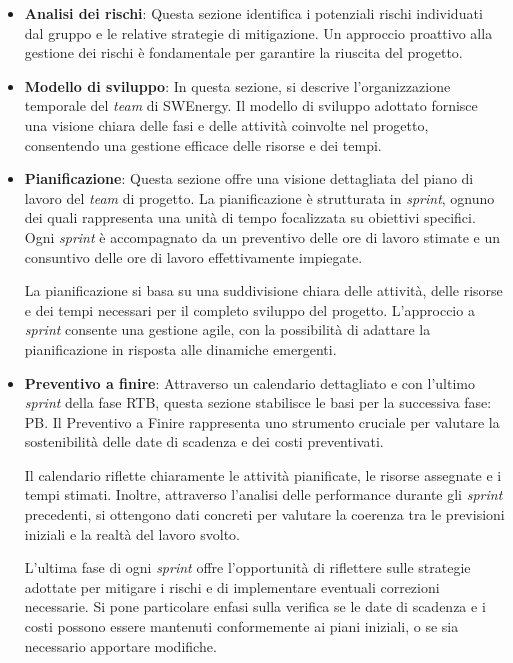 \begin{itemize}
	\item \textbf{Analisi dei rischi}: Questa sezione identifica i potenziali
	      rischi individuati dal gruppo e le relative strategie di mitigazione.
	      Un approccio proattivo alla gestione dei rischi è fondamentale
	      per garantire la riuscita del progetto.

	\item \textbf{Modello di sviluppo}: In questa sezione, si descrive
	      l'organizzazione temporale del \textit{team} di SWEnergy.
	      Il modello di sviluppo adottato fornisce una visione chiara delle fasi
	      e delle attività coinvolte nel progetto, consentendo una gestione
	      efficace delle risorse e dei tempi.

	\item \textbf{Pianificazione}: Questa sezione offre una visione dettagliata
	      del piano di lavoro del \textit{team} di progetto.
	      La pianificazione è strutturata in \textit{sprint}, ognuno dei quali
	      rappresenta una unità di tempo focalizzata su obiettivi specifici.
	      Ogni \textit{sprint} è accompagnato da un preventivo delle ore di lavoro stimate
	      e un consuntivo delle ore di lavoro effettivamente impiegate.

	      La pianificazione si basa su una suddivisione chiara delle attività, delle risorse
	      e dei tempi necessari per il completo sviluppo del progetto.
	      L'approccio a \textit{sprint} consente una gestione agile, con la possibilità di
	      adattare la pianificazione in risposta alle dinamiche emergenti.

	\item \textbf{Preventivo a finire}: Attraverso un calendario dettagliato e con l'ultimo
	      \textit{sprint} della fase RTB, questa sezione stabilisce le basi per la successiva fase: PB.
	      Il Preventivo a Finire rappresenta uno strumento cruciale per valutare
	      la sostenibilità delle date di scadenza e dei costi preventivati.

	      Il calendario riflette chiaramente le attività pianificate, le risorse assegnate
	      e i tempi stimati.
	      Inoltre, attraverso l'analisi delle performance durante gli \textit{sprint} precedenti,
	      si ottengono dati concreti per valutare la coerenza tra le previsioni iniziali
	      e la realtà del lavoro svolto.

	      L'ultima fase di ogni \textit{sprint} offre l'opportunità di riflettere sulle strategie
	      adottate per mitigare i rischi e di implementare eventuali correzioni necessarie.
	      Si pone particolare enfasi sulla verifica se le date di scadenza e i costi possono
	      essere mantenuti conformemente ai piani iniziali, o se sia necessario apportare modifiche.


\end{itemize}
